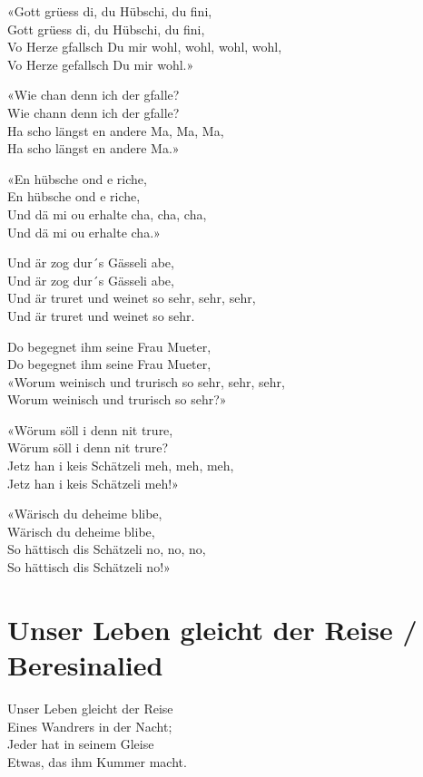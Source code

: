 \documentclass[
  letterpaper,
  twoside=false]{scrbook}
\begin{document}
«Gott grüess di, du Hübschi, du fini,\\
Gott grüess di, du Hübschi, du fini,\\
Vo Herze gfallsch Du mir wohl, wohl, wohl, wohl,\\
Vo Herze gefallsch Du mir wohl.»

«Wie chan denn ich der gfalle?\\
Wie chann denn ich der gfalle?\\
Ha scho längst en andere Ma, Ma, Ma,\\
Ha scho längst en andere Ma.»

«En hübsche ond e riche,\\
En hübsche ond e riche,\\
Und dä mi ou erhalte cha, cha, cha,\\
Und dä mi ou erhalte cha.»

Und är zog dur´s Gässeli abe,\\
Und är zog dur´s Gässeli abe,\\
Und är truret und weinet so sehr, sehr, sehr,\\
Und är truret und weinet so sehr.

Do begegnet ihm seine Frau Mueter,\\
Do begegnet ihm seine Frau Mueter,\\
«Worum weinisch und trurisch so sehr, sehr, sehr,\\
Worum weinisch und trurisch so sehr?»

«Wörum söll i denn nit trure,\\
Wörum söll i denn nit trure?\\
Jetz han i keis Schätzeli meh, meh, meh,\\
Jetz han i keis Schätzeli meh!»

«Wärisch du deheime blibe,\\
Wärisch du deheime blibe,\\
So hättisch dis Schätzeli no, no, no,\\
So hättisch dis Schätzeli no!»

\hypertarget{unser-leben-gleicht-der-reise-beresinalied}{%
\chapter{Unser Leben gleicht der Reise /
Beresinalied}\label{unser-leben-gleicht-der-reise-beresinalied}}

Unser Leben gleicht der Reise\\
Eines Wandrers in der Nacht;\\
Jeder hat in seinem Gleise\\
Etwas, das ihm Kummer macht.
\end{document}
